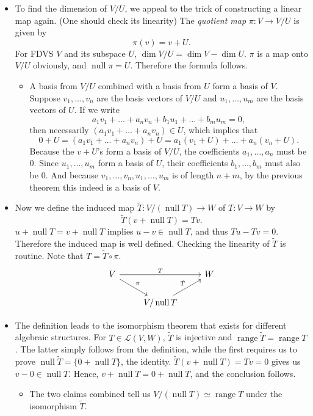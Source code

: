 \documentclass{article}
\newcommand{\n}{\operatorname{null}}
\renewcommand{\r}{\operatorname{range}}
\renewcommand{\d}{\dim}
\newcommand{\LVW}{\mathcal{L}(V,W)}
\begin{document}
\begin{itemize}
\begin{itemize}
    \end{itemize}
    \item To find the dimension of $V/U$, we appeal to the trick of constructing a linear map again. (One should check its linearity) The \textit{quotient map} $\pi: V \to V/U$ is given by $$\pi(v) = v+U.$$
    For FDVS $V$ and its subspace $U$, $\d V/U = \d V - \d U$. $\pi$ is a map onto $V/U$ obviously, and $\n \pi = U$. Therefore the formula follows.
    \begin{itemize}
        \item A basis from $V/U$ combined with a basis from $U$ form a basis of $V$. Suppose $v_1,\dots,v_n$ are the basis vectors of $V/U$ and $u_1,\dots,u_m$ are the basis vectors of $U$. If we write $$a_1v_1+\dots+a_nv_n + b_1u_1+\dots+b_mu_m = 0,$$ then necessarily $(a_1v_1+\dots+a_nv_n) \in U$, which implies that $$0+U = (a_1v_1+\dots+a_nv_n)+U = a_1(v_1+U)+\dots+a_n(v_n+U).$$ Because the $v+U$'s form a basis of $V/U$, the coefficients $a_1,\dots,a_n$ must be 0. Since $u_1,\dots,u_m$ form a basis of $U$, their coefficients $b_1,\dots,b_m$ must also be 0. And because $v_1,\dots,v_n,u_1,\dots,u_m$ is of length $n+m$, by the previous theorem this indeed is a basis of $V$.
    \end{itemize}
    \item Now we define the induced map $\tilde{T}: V/(\n T) \to W$ of $T: V \to W$ by $$\tilde{T}(v+\n T) = Tv.$$ $u + \n T = v + \n T$ implies $u - v \in \n T$, and thus $Tu-Tv = 0$. Therefore the induced map is well defined. Checking the linearity of $\tilde{T}$ is routine. Note that $T = \tilde{T} \circ \pi$.
    \begin{equation*}
            \begin{tikzcd}
                V \arrow[rr,"T"] \arrow[dr,"\pi"] && W \\
                & {V/\n T} \arrow[ur,"\tilde{T}"]
            \end{tikzcd}
        \end{equation*}
    \item The definition leads to the isomorphism theorem that exists for different algebraic structures. For $T \in \LVW$, $\tilde{T}$ is injective and $\r \tilde{T} = \r T$. The latter simply follows from the definition, while the first requires us to prove $\n \tilde{T} = \{0+\n T\}$, the identity. $\tilde{T}(v+\n T) = Tv = 0$ gives us $v-0 \in \n T$. Hence, $v+\n T = 0+\n T$, and the conclusion follows.
        \begin{itemize}
            \item The two claims combined tell us $V/(\n T) \simeq \r T$ under the isomorphism $\tilde{T}$.
        \end{itemize}
    \end{itemize}
    
\end{document}
